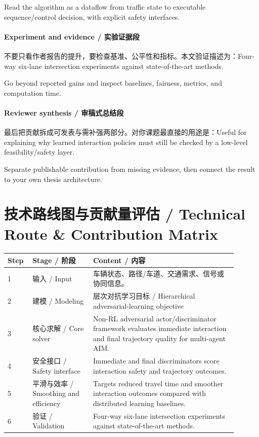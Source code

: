 \documentclass[UTF8,a4paper,11pt,fontset=fandol]{ctexart}
\begin{document}
Read the algorithm as a dataflow from traffic state to executable sequence/control decision, with explicit safety interfaces.

\paragraph{Experiment and evidence / 实验证据段}不要只看作者报告的提升，要检查基准、公平性和指标。本文验证描述为：Four-way six-lane intersection experiments against state-of-the-art methods.

Go beyond reported gains and inspect baselines, fairness, metrics, and computation time.

\paragraph{Reviewer synthesis / 审稿式总结段}最后把贡献拆成可发表与需补强两部分。对你课题最直接的用途是：Useful for explaining why learned interaction policies must still be checked by a low-level feasibility/safety layer.

Separate publishable contribution from missing evidence, then connect the result to your own thesis architecture.


\section{技术路线图与贡献量评估 / Technical Route \& Contribution Matrix}
\begin{longtable}{p{0.08\linewidth}p{0.24\linewidth}p{0.58\linewidth}}
\toprule
Step & Stage / 阶段 & Content / 内容\\
\midrule
1 & 输入 / Input & 车辆状态、路径/车道、交通需求、信号或协同信息。 \\
2 & 建模 / Modeling & 层次对抗学习目标 / Hierarchical adversarial-learning objective \\
3 & 核心求解 / Core solver & Non-RL adversarial actor/discriminator framework evaluates immediate interaction and final trajectory quality for multi-agent AIM. \\
4 & 安全接口 / Safety interface & Immediate and final discriminators score interaction safety and trajectory outcomes. \\
5 & 平滑与效率 / Smoothing and efficiency & Targets reduced travel time and smoother interaction outcomes compared with distributed learning baselines. \\
6 & 验证 / Validation & Four-way six-lane intersection experiments against state-of-the-art methods. \\
\bottomrule
\end{longtable}
\end{document}

